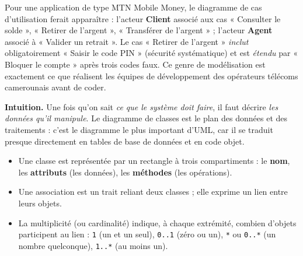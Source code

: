 \documentclass[11pt]{article}
\newcommand{\cle}[1]{{\popxbold\color{popdark}#1}}
\newcounter{popsec}
\newcounter{popsub}
\newcommand{\courssub}[1]{%
  \stepcounter{popsub}%
  \par\vspace{9pt}\noindent{\popxbold\fontsize{11.5}{13}\selectfont\color{popink}{\color{poporange}\thepopsec.\thepopsub}\hspace{6pt}#1}\par\nopagebreak\vspace{4pt}
}
\begin{document}
\begin{exemplebox}
Pour une application de type MTN Mobile Money, le diagramme de cas d'utilisation ferait apparaître : l'acteur \textbf{Client} associé aux cas « Consulter le solde », « Retirer de l'argent », « Transférer de l'argent » ; l'acteur \textbf{Agent} associé à « Valider un retrait ». Le cas « Retirer de l'argent » \emph{inclut} obligatoirement « Saisir le code PIN » (sécurité systématique) et est \emph{étendu} par « Bloquer le compte » après trois codes faux. Ce genre de modélisation est exactement ce que réalisent les équipes de développement des opérateurs télécoms camerounais avant de coder.
\end{exemplebox}

\courssub{Le diagramme de classes}

\textbf{Intuition.} Une fois qu'on sait \emph{ce que le système doit faire}, il faut décrire \emph{les données qu'il manipule}. Le diagramme de classes est le plan des données et des traitements : c'est le diagramme le plus important d'UML, car il se traduit presque directement en tables de base de données et en code objet.

\begin{definition}
\begin{itemize}
\item Une \cle{classe} est représentée par un rectangle à trois compartiments : le \textbf{nom}, les \textbf{attributs} (les données), les \textbf{méthodes} (les opérations).
\item Une \cle{association} est un trait reliant deux classes ; elle exprime un lien entre leurs objets.
\item La \cle{multiplicité} (ou cardinalité) indique, à chaque extrémité, combien d'objets participent au lien : \texttt{1} (un et un seul), \texttt{0..1} (zéro ou un), \texttt{*} ou \texttt{0..*} (un nombre quelconque), \texttt{1..*} (au moins un).
\end{itemize}
\end{definition}
\end{document}
